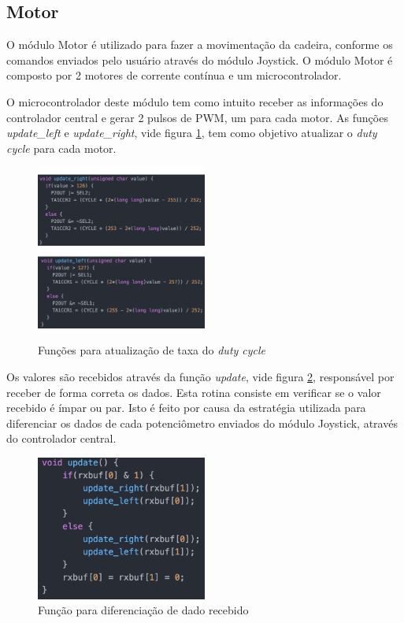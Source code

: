 \subsection{Motor}

    O módulo Motor é utilizado para fazer a movimentação da cadeira, conforme os comandos enviados pelo usuário através do módulo Joystick. O módulo Motor é composto por 2 motores de corrente contínua e um microcontrolador.

    O microcontrolador deste módulo tem como intuito receber as informações do controlador central e gerar 2 pulsos de PWM, um para cada motor. As funções \textit{update\_left} e \textit{update\_right}, vide figura \ref{fig:update_motors}, tem como objetivo atualizar o \textit{duty cycle} para cada motor.

    \begin{figure}[!htb]
    \centering
    \includegraphics[width = 0.5\textwidth]{figuras/resultados/update_motor_right}
    \includegraphics[width = 0.5\textwidth]{figuras/resultados/update_motor_left}
    \caption{Funções para atualização de taxa do \textit{duty cycle}}
    \label{fig:update_motors}
    \end{figure}

    Os valores são recebidos através da função \textit{update}, vide figura \ref{fig:update}, responsável por receber de forma correta os dados. Esta rotina consiste em verificar se o valor recebido é ímpar ou par. Isto é feito por causa da estratégia utilizada para diferenciar os dados de cada potenciômetro enviados do módulo Joystick, através do controlador central.

    \begin{figure}[!htb]
    \centering
    \includegraphics[width = 0.5\textwidth]{figuras/resultados/update}
    \caption{Função para diferenciação de dado recebido}
    \label{fig:update}
    \end{figure}

